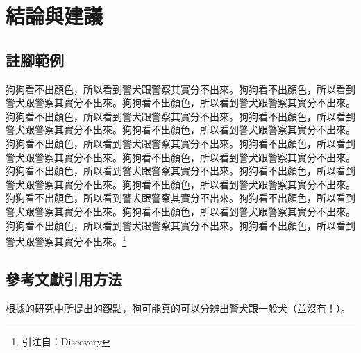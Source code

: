 \chapter{結論與建議}
\label{c:experiment}

\section{註腳範例}

狗狗看不出顏色，所以看到警犬跟警察其實分不出來。狗狗看不出顏色，所以看到警犬跟警察其實分不出來。狗狗看不出顏色，所以看到警犬跟警察其實分不出來。狗狗看不出顏色，所以看到警犬跟警察其實分不出來。狗狗看不出顏色，所以看到警犬跟警察其實分不出來。狗狗看不出顏色，所以看到警犬跟警察其實分不出來。狗狗看不出顏色，所以看到警犬跟警察其實分不出來。狗狗看不出顏色，所以看到警犬跟警察其實分不出來。狗狗看不出顏色，所以看到警犬跟警察其實分不出來。狗狗看不出顏色，所以看到警犬跟警察其實分不出來。狗狗看不出顏色，所以看到警犬跟警察其實分不出來。狗狗看不出顏色，所以看到警犬跟警察其實分不出來。狗狗看不出顏色，所以看到警犬跟警察其實分不出來。狗狗看不出顏色，所以看到警犬跟警察其實分不出來。狗狗看不出顏色，所以看到警犬跟警察其實分不出來。狗狗看不出顏色，所以看到警犬跟警察其實分不出來。狗狗看不出顏色，所以看到警犬跟警察其實分不出來。\footnote{引注自：Discovery}


\section{參考文獻引用方法}


根據\cite{slabbert1999early}的研究中所提出的觀點，狗可能真的可以分辨出警犬跟一般犬（並沒有！）。